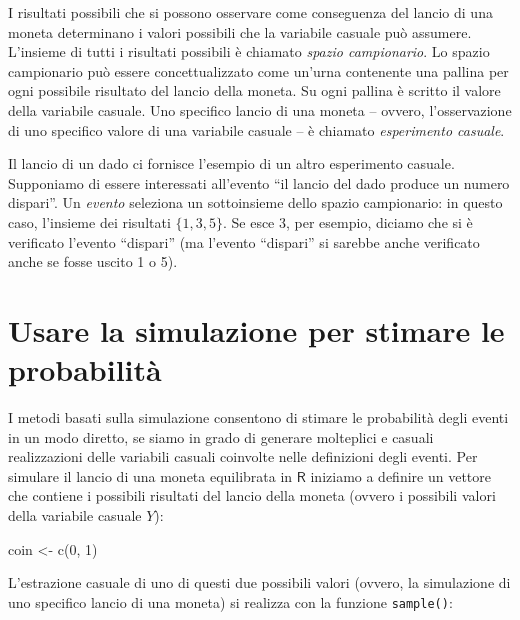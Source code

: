 \documentclass[
  11pt,
]{krantz}
\makeatletter
\newenvironment{Shaded}{\begin{snugshade}}{\end{snugshade}}
\newcommand{\DecValTok}[1]{\textcolor[rgb]{0.06,0.06,0.06}{#1}}
\newcommand{\FunctionTok}[1]{\textcolor[rgb]{0,0,0}{#1}}
\newcommand{\NormalTok}[1]{#1}
\newcommand{\OtherTok}[1]{\textcolor[rgb]{0.37,0.37,0.37}{#1}}
\newenvironment{kframe}{%
\medskip{}
\setlength{\fboxsep}{.8em}
 \def\at@end@of@kframe{}%
 \ifinner\ifhmode%
  \def\at@end@of@kframe{\end{minipage}}%
  \begin{minipage}{\columnwidth}%
 \fi\fi%
 \def\FrameCommand##1{\hskip\@totalleftmargin \hskip-\fboxsep
 \colorbox{shadecolor}{##1}\hskip-\fboxsep
     \hskip-\linewidth \hskip-\@totalleftmargin \hskip\columnwidth}%
 \MakeFramed {\advance\hsize-\width
   \@totalleftmargin\z@ \linewidth\hsize
   \@setminipage}}%
 {\par\unskip\endMakeFramed%
 \at@end@of@kframe}
\renewenvironment{Shaded}{\begin{kframe}}{\end{kframe}}
\newcommand{\R}{\textsf{R}} %
\theoremstyle{definition}
\theoremstyle{definition}
\theoremstyle{definition}
\theoremstyle{definition}
\theoremstyle{remark}
\makeatother
\begin{document}
I risultati possibili che si possono osservare come conseguenza del lancio di una moneta determinano i valori possibili che la variabile casuale può assumere. L'insieme di tutti i risultati possibili è chiamato \emph{spazio campionario}. Lo spazio campionario può essere concettualizzato come un'urna contenente una pallina per ogni possibile risultato del lancio della moneta. Su ogni pallina è scritto il valore della variabile casuale. Uno specifico lancio di una moneta -- ovvero, l'osservazione di uno specifico valore di una variabile casuale -- è chiamato \emph{esperimento casuale}.

Il lancio di un dado ci fornisce l'esempio di un altro esperimento casuale. Supponiamo di essere interessati all'evento ``il lancio del dado produce un numero dispari''. Un \emph{evento} seleziona un sottoinsieme dello spazio campionario: in questo caso, l'insieme dei risultati \(\{1, 3, 5\}\). Se esce 3, per esempio, diciamo che si è verificato l'evento ``dispari'' (ma l'evento ``dispari'' si sarebbe anche verificato anche se fosse uscito 1 o 5).

\hypertarget{usare-la-simulazione-per-stimare-le-probabilituxe0}{%
\section{Usare la simulazione per stimare le probabilità}\label{usare-la-simulazione-per-stimare-le-probabilituxe0}}

I metodi basati sulla simulazione consentono di stimare le probabilità degli eventi in un modo diretto, se siamo in grado di generare molteplici e casuali realizzazioni delle variabili casuali coinvolte nelle definizioni degli eventi. Per simulare il lancio di una moneta equilibrata in \(\R\) iniziamo a definire un vettore che contiene i possibili risultati del lancio della moneta (ovvero i possibili valori della variabile casuale \(Y\)):

\begin{Shaded}
\begin{Highlighting}[]
\NormalTok{coin }\OtherTok{\textless{}{-}} \FunctionTok{c}\NormalTok{(}\DecValTok{0}\NormalTok{, }\DecValTok{1}\NormalTok{)}
\end{Highlighting}
\end{Shaded}

\noindent L'estrazione casuale di uno di questi due possibili valori (ovvero, la simulazione di uno specifico lancio di una moneta) si realizza con la funzione \texttt{sample()}:
\end{document}
